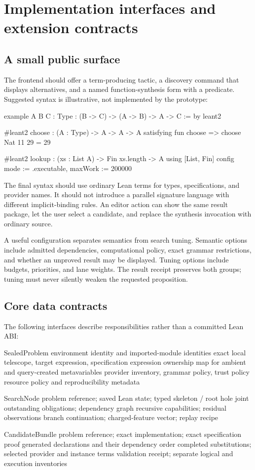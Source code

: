 \documentclass[11pt,letterpaper]{article}
\theoremstyle{definition}
\theoremstyle{remark}
\begin{document}
\section{Implementation interfaces and extension contracts}
\label{sec:interfaces}

\subsection{A small public surface}

The frontend should offer a term-producing tactic, a discovery command that displays alternatives, and a named function-synthesis form with a predicate. Suggested syntax is illustrative, not implemented by the prototype:
\begin{code}
example {A B C : Type} : (B -> C) -> (A -> B) -> A -> C := by
  leant2

#leant2 choose : (A : Type) -> A -> A -> A
  satisfying fun choose => choose Nat 11 29 = 29

#leant2 lookup : (xs : List A) -> Fin xs.length -> A
  using [List, Fin]
  config { mode := .executable, maxWork := 200000 }
\end{code}

The final syntax should use ordinary Lean terms for types, specifications, and provider names. It should not introduce a parallel signature language with different implicit-binding rules. An editor action can show the same result package, let the user select a candidate, and replace the synthesis invocation with ordinary source.

A useful configuration separates semantics from search tuning. Semantic options include admitted dependencies, computational policy, exact grammar restrictions, and whether an unproved result may be displayed. Tuning options include budgets, priorities, and lane weights. The result receipt preserves both groups; tuning must never silently weaken the requested proposition.

\subsection{Core data contracts}

The following interfaces describe responsibilities rather than a committed Lean ABI:
\begin{code}
SealedProblem
  environment identity and imported-module identities
  exact local telescope, target expression, specification expression
  ownership map for ambient and query-created metavariables
  provider inventory, grammar policy, trust policy
  resource policy and reproducibility metadata

SearchNode
  problem reference; saved Lean state; typed skeleton / root hole
  joint outstanding obligations; dependency graph
  recursive capabilities; residual observations
  branch continuation; charged-feature vector; replay recipe

CandidateBundle
  problem reference; exact implementation; exact specification proof
  generated declarations and their dependency order
  completed substitutions; selected provider and instance terms
  validation receipt; separate logical and execution inventories
\end{code}
\end{document}

